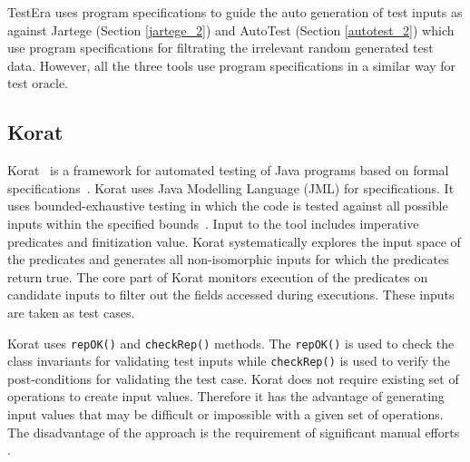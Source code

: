TestEra uses program specifications to guide the auto generation of test inputs as against Jartege (Section \ref{jartege_2}) and AutoTest (Section \ref{autotest_2}) which use program specifications for filtrating the irrelevant random generated test data. However, all the three tools use program specifications in a similar way for test oracle. 



\subsection{Korat} %
Korat~\cite{boyapati2002korat} is a framework for automated testing of Java programs based on formal specifications~\cite{chang1999structural}. %
Korat uses Java Modelling Language (JML) for specifications. It uses bounded-exhaustive testing in which the code is tested against all possible inputs within the specified bounds~\cite{khurshid2001checking}. %
Input to the tool includes imperative predicates and finitization value. Korat systematically explores the input space of the predicates and generates all non-isomorphic inputs for which the predicates return true. The core part of Korat monitors execution of the predicates on candidate inputs to filter out the fields accessed during executions. These inputs are taken as test cases. 

Korat uses \verb+repOK()+ and \verb+checkRep()+ methods. The \verb+repOK()+ is used to check the class invariants for validating test inputs while \verb+checkRep()+ is used to verify the post-conditions for validating the test case. Korat does not require existing set of operations to create input values. Therefore it has the advantage of generating input values that may be difficult or impossible with a given set of operations. The disadvantage of the approach is the requirement of significant manual efforts \cite{pacheco2009directed}.    

